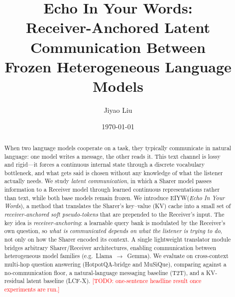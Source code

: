 \documentclass[11pt]{article}
\title{\textbf{Echo In Your Words}:\\
Receiver-Anchored Latent Communication Between\\
Frozen Heterogeneous Language Models}
\author{
  Jiyao Liu\\
  \texttt{\TODO{affiliation / email}}
}
\date{\today}
\newcommand{\method}{\textsc{EIYW}\xspace}      %
\newcommand{\lcfx}{\textsc{LCF-X}\xspace}        %
\newcommand{\ttt}{\textsc{T2T}\xspace}           %
\newcommand{\sharer}{\textsf{Sharer}\xspace}
\newcommand{\receiver}{\textsf{Receiver}\xspace}
\newcommand{\TODO}[1]{\textcolor{red}{[TODO: #1]}}
\begin{document}
\maketitle

\begin{abstract}
When two language models cooperate on a task, they typically communicate in
natural language: one model writes a message, the other reads it. This text
channel is lossy and rigid---it forces a continuous internal state through a
discrete vocabulary bottleneck, and what gets said is chosen without any
knowledge of what the listener actually needs. We study \emph{latent
communication}, in which a \sharer model passes information to a \receiver model
through learned continuous representations rather than text, while both base
models remain frozen. We introduce \method (\emph{Echo In Your Words}), a method
that translates the \sharer's key--value (KV) cache into a small set of
\emph{receiver-anchored soft pseudo-tokens} that are prepended to the
\receiver's input. The key idea is \emph{receiver-anchoring}: a learnable query
bank is modulated by the \receiver's own question, so \emph{what is communicated
depends on what the listener is trying to do}, not only on how the \sharer
encoded its context. A single lightweight translator module bridges arbitrary
\sharer/\receiver architectures, enabling communication between heterogeneous
model families (e.g.\ Llama~$\rightarrow$~Gemma). We evaluate on cross-context
multi-hop question answering (HotpotQA-bridge and MuSiQue), comparing against a
no-communication floor, a natural-language messaging baseline (\ttt), and a
KV-residual latent baseline (\lcfx). \TODO{one-sentence headline result once
experiments are run.}
\end{abstract}

\end{document}
